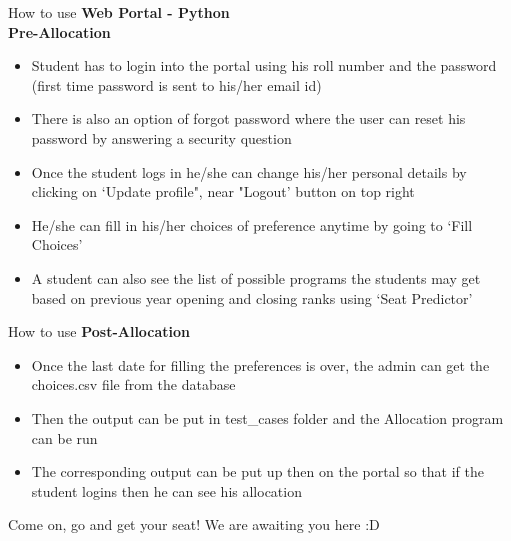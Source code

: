 \documentclass{beamer}
\begin{document}
\begin{frame}[t]{How to use}
\textbf{Web Portal - Python}\\
\pause
\textbf{Pre-Allocation}\\
\begin{itemize}[<+->]
\item Student has to login into the portal using his roll number and the password (first time password is sent to his/her email id)
\item There is also an option of forgot password where the user can reset his password by answering a security question
\item Once the student logs in he/she can change his/her personal details by clicking on `Update profile", near "Logout' button on top right
\item He/she can fill in his/her choices of preference anytime by going to `Fill Choices'
\item A student can also see the list of possible programs the students may get based on previous year opening and closing ranks using `Seat Predictor'
\end{itemize}
\end{frame}
\begin{frame}[t]{How to use}
\textbf{Post-Allocation}\\
\begin{itemize}[<+->]
\item Once the last date for filling the preferences is over, the admin can get the choices.csv file from the database
\item Then the output can be put in test\_cases folder and the Allocation program can be run
\item The corresponding output can be put up then on the portal so that if the student logins then he can see his allocation
\end{itemize}
\pause
Come on, go and get your seat! We are awaiting you here :D
\end{frame}
\end{document}
